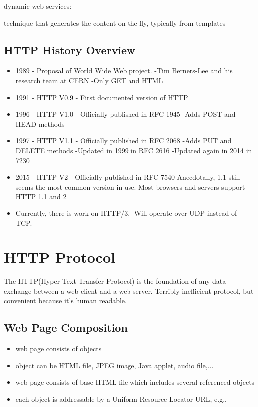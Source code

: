 \documentclass[fancy,11pt,titlestyle=display]{style/elegantbook}
\begin{document}
dynamic web services:
\begin{itemize}{}
  technique that generates the content on the fly, typically from templates
\end{itemize}
  

\subsection{HTTP History Overview}
\begin{itemize}
\item 1989 - Proposal of World Wide Web project.
-Tim Berners-Lee and his research team at CERN
-Only GET and HTML
\item 1991 - HTTP V0.9 - First documented version of HTTP
\item 1996 - HTTP V1.0 - Officially published in RFC 1945
-Adds POST and HEAD methods
\item 1997 - HTTP V1.1 - Officially published in RFC 2068
-Adds PUT and DELETE methods
-Updated in 1999 in RFC 2616
-Updated again in 2014 in 7230
\item 2015 - HTTP V2 - Officially published in RFC 7540
Anecdotally, 1.1 still seems the most common version in use.
Most browsers and servers support HTTP 1.1 and 2
\item Currently, there is work on HTTP/3.
-Will operate over UDP instead of TCP.
\end{itemize}
\section{HTTP Protocol}

The HTTP(Hyper Text Transfer Protocol) is the foundation of any data exchange between a web client and a web server.   Terribly inefficient protocol, but convenient because it's human readable.


\subsection{Web Page Composition}
\begin{itemize}
\item web page consists of objects
\item object can be HTML file, JPEG image, Java applet,
audio file,...
\item web page consists of base HTML-file which
includes several referenced objects
\item each object is addressable by a Uniform Resource
Locator URL, e.g.,
\end{itemize}
\end{document}
